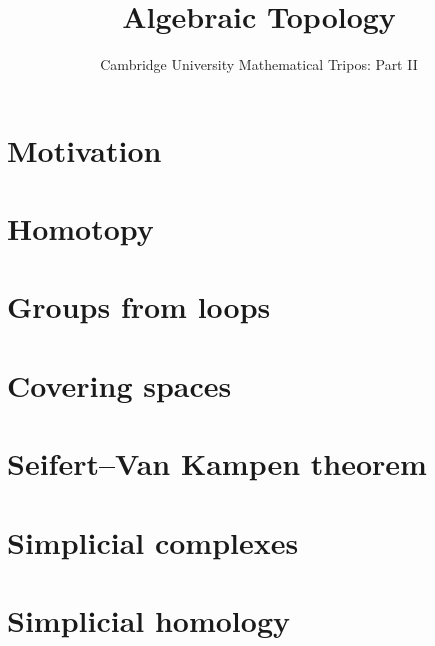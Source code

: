 \documentclass{article}
\title{Algebraic Topology}
\author{Cambridge University Mathematical Tripos: Part II}
\begin{document}
\maketitle

\tableofcontentsnewpage{}

\section{Motivation}

\section{Homotopy}

\section{Groups from loops}

\section{Covering spaces}

\section{Seifert--Van Kampen theorem}

\section{Simplicial complexes}

\section{Simplicial homology}

\end{document}
